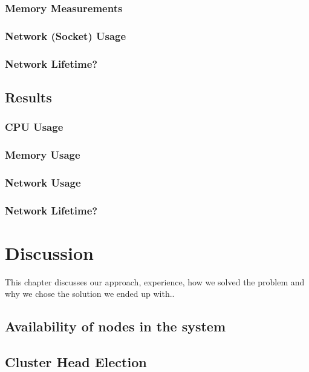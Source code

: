 \documentclass[USenglish]{uit-thesis}
\begin{document}
\subsection{Memory Measurements}
\subsection{Network (Socket) Usage}
\subsection{Network Lifetime?}


\section{Results}
\subsection{CPU Usage}
\subsection{Memory Usage}
\subsection{Network Usage}
\subsection{Network Lifetime?}


\chapter{Discussion}

This chapter discusses our approach, experience, how we solved the problem and why we chose the solution we ended up with..


\section{Availability of nodes in the system}


\section{Cluster Head Election}
\end{document}
